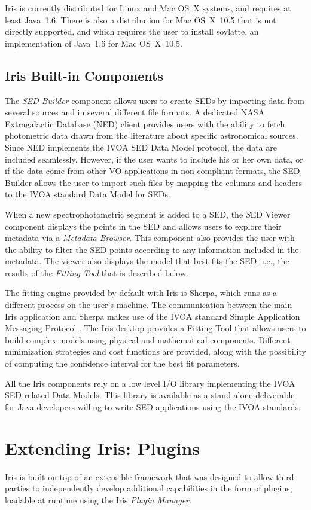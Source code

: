 \documentclass[11pt,twoside]{article}
\begin{document}
Iris is currently distributed for Linux and Mac OS~X systems, and requires at least Java~1.6. There is also a distribution for Mac OS~X~10.5 that is not directly supported, and which requires the user to install soylatte, an implementation of Java~1.6 for Mac OS~X~10.5.

\subsection{Iris Built-in Components}
The \emph{SED Builder} component allows users to create SEDs by importing data from several sources and in several different file formats. A dedicated NASA Extragalactic Database (NED) client provides users with the ability to fetch photometric data drawn from the literature about specific astronomical sources. Since NED implements the IVOA SED Data Model protocol, the data are included seamlessly. However, if the user wants to include his or her own data, or if the data come from other VO applications in non-compliant formats, the SED Builder allows the user to import such files by mapping the columns and headers to the IVOA standard Data Model for SEDs.

When a new spectrophotometric segment is added to a SED, the {\emph SED Viewer} component displays the points in the SED and allows users to explore their metadata via a \emph{Metadata Browser}.  This component also provides the user with the ability to filter the SED points according to any information included in the metadata.
The viewer also displays the model that best fits the SED, i.e., the results of the \emph{Fitting Tool} that is described below.

The fitting engine provided by default with Iris is Sherpa, which runs as a different process on the user's machine. The communication between the main Iris application and Sherpa makes use of the IVOA standard Simple Application Messaging Protocol \citep[SAMP;][]{samp1.3}.
The Iris desktop provides a Fitting Tool that allows users to build complex models using physical and mathematical components. Different minimization strategies and cost functions are provided, along with the possibility of computing the confidence interval for the best fit parameters.

All the Iris components rely on a low level I/O library implementing the IVOA SED-related Data Models. This library is available as a stand-alone deliverable for Java developers willing to write SED applications using the IVOA standards.

\section{Extending Iris: Plugins}
Iris is built on top of an extensible framework that was designed to allow third parties to independently develop additional capabilities in the form of plugins, loadable at runtime using the Iris \emph{Plugin Manager}.
\end{document}
